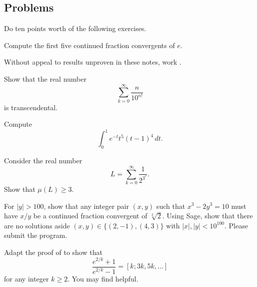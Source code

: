 \documentclass[../notes.tex]{subfiles}
\begin{document}
\subsection{Problems}
Do ten points worth of the following exercises.
\begin{prob}[1 points]
	Compute the first five continued fraction convergents of $e$.
\end{prob}
\begin{prob}[2 points]
	Without appeal to results unproven in these notes, work .
\end{prob}
\begin{prob}[3 points]
	Show that the real number
	\[\sum_{k=0}^\infty\frac n{10^{n!}}\]
	is transcendental.
\end{prob}
\begin{prob}[3 points]
	Compute
	\[\int_0^1e^{-t}t^5(t-1)^4\,dt.\]
\end{prob}
\begin{prob}[4 points]
	Consider the real number
	\[L=\sum_{k=0}^\infty\frac1{2^{3^r}}.\]
	Show that $\mu(L)\ge3$.
\end{prob}
\begin{prob}[5 points]
	For $\left|y\right|>100$, show that any integer pair $(x,y)$ such that $x^3-2y^3=10$ must have $x/y$ be a continued fraction convergent of $\sqrt[3]2$. Using Sage, show that there are no solutions aside $(x,y)\in\{(2,-1),(4,3)\}$ with $\left|x\right|,\left|y\right|<10^{100}$. Please submit the program.
\end{prob}
\begin{prob}[10 points]
	Adapt the proof of  to show that
	\[\frac{e^{2/k}+1}{e^{2/k}-1}=[k;3k,5k,\ldots]\]
	for any integer $k\ge2$. You may find \cite{olds-cf-e} helpful.
\end{prob}
\end{document}
